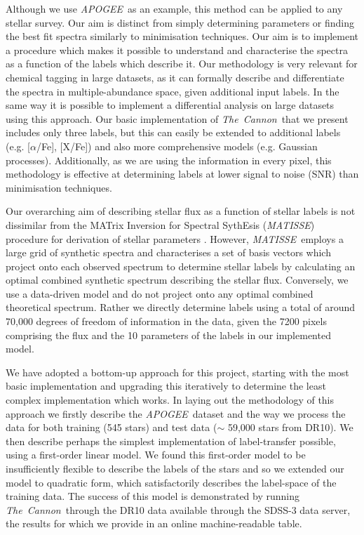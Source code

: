 \documentclass[12pt, preprint]{aastex}
\newcommand{\tc}{\textsl{The~Cannon}}
\newcommand{\apogee}{\textsl{APOGEE}}
\newcommand{\matisse}{\textsl{MATISSE}}
\begin{document}

Although we use \apogee\ as an example, this method can be applied to any stellar survey.  Our aim is distinct from simply determining parameters or finding the best fit spectra similarly to minimisation techniques. Our aim is to implement a procedure which makes it possible to understand and characterise the spectra as a function of the labels which describe it.  Our methodology is very relevant for chemical tagging in large datasets, as it can formally describe and differentiate the spectra in multiple-abundance space, given additional input labels. In the same way it is possible to implement a differential analysis on large datasets using this approach. Our basic implementation of \tc\ that we present includes only three labels, but this can easily be extended to additional labels  (e.g. [$\alpha$/Fe], [X/Fe]) and also more comprehensive models (e.g. Gaussian processes). Additionally, as we are using the information in every pixel, this methodology is effective at determining labels at lower signal to noise (SNR) than minimisation techniques.%

Our overarching aim of describing stellar flux as a function of stellar labels is not dissimilar from the MATrix Inversion for Spectral SythEsis (\matisse) procedure for derivation of stellar parameters \citep{RB2006}. However, \matisse\ employs a large grid of synthetic spectra and characterises a set of basis vectors which project onto each observed spectrum to determine stellar labels by calculating an optimal combined synthetic spectrum describing the stellar flux. Conversely, we use a data-driven model and do not project onto any optimal combined theoretical spectrum. Rather we directly determine labels using a total of around 70,000 degrees of freedom of information in the data, given the 7200 pixels comprising the flux and the 10 parameters of the labels in our implemented model. 

We have adopted a bottom-up approach for this project, starting with the most basic implementation and upgrading this iteratively to determine the least complex implementation which works.  In laying out the methodology of this approach we firstly describe the \apogee\ dataset and the way we process the data for both training (545 stars) and test data ($\sim$ 59,000 stars from DR10). We then describe perhaps the simplest implementation of label-transfer possible, using a first-order linear model. We found this first-order model to be insufficiently flexible to describe the labels of the stars and so we extended our model to quadratic form, which satisfactorily describes the label-space of the training data. The success of this model is demonstrated by running \tc\ through the DR10 data available through the SDSS-3 data server, the results for which we provide in an online machine-readable table. %
\end{document}

